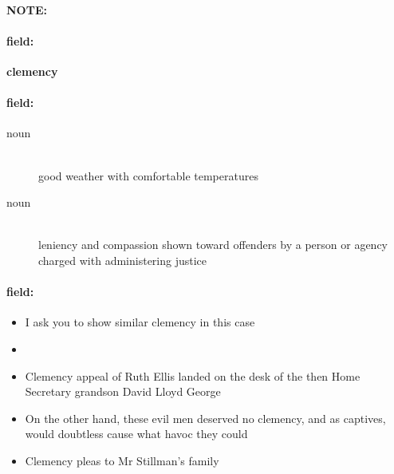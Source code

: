 \documentclass[12pt]{article}
\newenvironment{note}{\paragraph{NOTE:}}{}
\newenvironment{field}{\paragraph{field:}}{}
\begin{document}
\begin{note}
\begin{field}
\textbf{\large clemency}
\end{field}


\begin{field}
\begin{description}
\item[noun] \hfill \\ 
good weather with comfortable temperatures

\item[noun] \hfill \\ 
leniency and compassion shown toward offenders by a person or agency charged with administering justice

\end{description}
\end{field}

\begin{field}
\begin{itemize}
\item I ask you to show similar clemency in this case
\item 
\item Clemency appeal of Ruth Ellis landed on the desk of the then Home Secretary grandson David Lloyd George
\item On the other hand, these evil men deserved no clemency, and as captives, would doubtless cause what havoc they could
\item Clemency pleas to Mr Stillman's family
\end{itemize}
\end{field}
\end{note}
\end{document}
